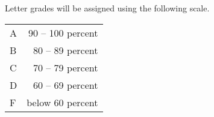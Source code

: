 Letter grades will be assigned using the following scale.

\vspace{3mm}
\begin{tabular}{@{}lr@{}}
\midrule
A & 90 – 100 percent \\
B & 80 – 89 percent \\
C & 70 – 79 percent \\
D & 60 – 69 percent \\
F & below 60 percent \\
\midrule
\end{tabular}
\vspace{3mm}
